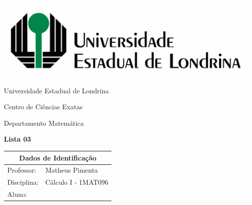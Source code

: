 \documentclass[oneside,a4paper,12pt]{article}
\newcommand{\universidade}{Universidade Estadual de Londrina}
\newcommand{\centro}{Centro de Ciências Exatas}
\newcommand{\departamento}{Departamento Matemática}
\newcommand{\curso}{Física}
\newcommand{\professores}{Matheus Pimenta}
\newcommand{\disciplina}{Cálculo I - 1MAT096}
\begin{document}
	\pagestyle{empty}
	
	\begin{center}
		\includegraphics[width=\linewidth/2]{logo.jpg}%
	 	\vspace{2pt} 	
		
		\universidade
		\par
		\centro
		\par
		\departamento
		\par
		\par
		\vspace{12pt}
		\LARGE \textbf{Lista 03}
		
	\end{center}
	
	\vspace{12pt}
	
	\begin{tabular}{ |l|p{12cm}| }
		
		\hline
		\multicolumn{2}{|c|}{\textbf{Dados de Identificação}} \\
		\hline
		Professor:         &    \professores           \\
		\hline
		Disciplina:        &    \disciplina          \\
		\hline
		Aluno:             &                   \\
		\hline
		
	\end{tabular}
	\vspace{6pt}
	
	
	\begin{snugshade}
	\end{snugshade}
\end{document}
